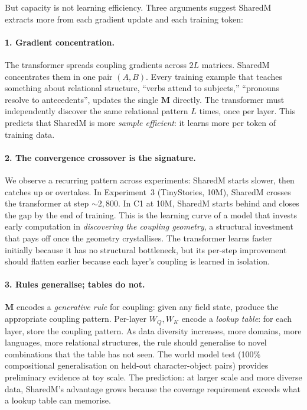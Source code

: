 \documentclass[11pt, a4paper]{article}
\newcommand{\M}{\mathbf{M}}
\theoremstyle{remark}
\begin{document}
But capacity is not learning efficiency.
Three arguments suggest SharedM extracts more from each gradient update and each training token:

\paragraph{1. Gradient concentration.}
The transformer spreads coupling gradients across $2L$ matrices.
SharedM concentrates them in one pair $(A, B)$.
Every training example that teaches something about relational structure, ``verbs attend to subjects,'' ``pronouns resolve to antecedents'', updates the single $\M$ directly.
The transformer must independently discover the same relational pattern $L$ times, once per layer.
This predicts that SharedM is more \emph{sample efficient}: it learns more per token of training data.

\paragraph{2. The convergence crossover is the signature.}
We observe a recurring pattern across experiments: SharedM starts slower, then catches up or overtakes.
In Experiment~3 (TinyStories, 10M), SharedM crosses the transformer at step ${\sim}2{,}800$.
In C1 at 10M, SharedM starts behind and closes the gap by the end of training.
This is the learning curve of a model that invests early computation in \emph{discovering the coupling geometry}, a structural investment that pays off once the geometry crystallises.
The transformer learns faster initially because it has no structural bottleneck, but its per-step improvement should flatten earlier because each layer's coupling is learned in isolation.

\paragraph{3. Rules generalise; tables do not.}
$\M$ encodes a \emph{generative rule} for coupling: given any field state, produce the appropriate coupling pattern.
Per-layer $W_Q, W_K$ encode a \emph{lookup table}: for each layer, store the coupling pattern.
As data diversity increases, more domains, more languages, more relational structures, the rule should generalise to novel combinations that the table has not seen.
The world model test (100\% compositional generalisation on held-out character-object pairs) provides preliminary evidence at toy scale.
The prediction: at larger scale and more diverse data, SharedM's advantage grows because the coverage requirement exceeds what a lookup table can memorise.
\end{document}
